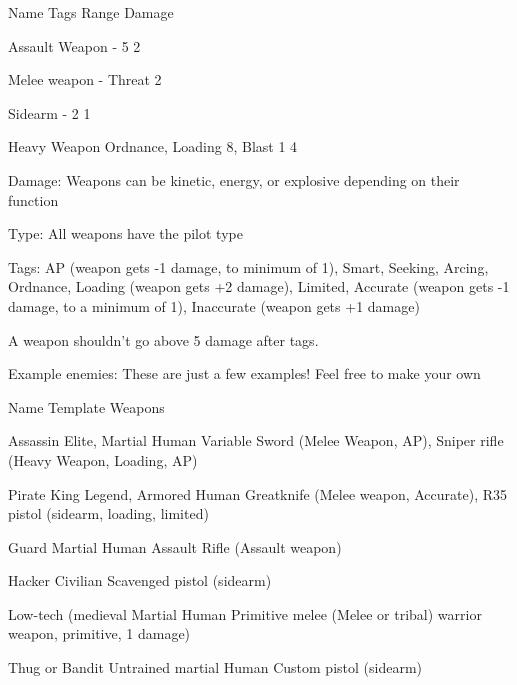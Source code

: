  Name                        Tags                          Range                    Damage 

 Assault Weapon               -                            5                        2 

 Melee weapon                 -                            Threat                   2 

                                                                                                         


 Sidearm                      -                             2                       1 

 Heavy Weapon                 Ordnance, Loading             8, Blast 1              4 

Damage: Weapons can be kinetic, energy, or explosive depending on their function
 
Type: All weapons have the pilot type
 
Tags: AP (weapon gets -1 damage, to minimum of 1), Smart, Seeking, Arcing, Ordnance,  
Loading (weapon gets +2 damage), Limited, Accurate (weapon gets -1 damage, to a minimum of  
1), Inaccurate (weapon gets +1 damage)
 

A weapon shouldn’t go above 5 damage after tags.
 

                                            Example enemies:  
These are just a few examples! Feel free to make your own
 

 Name                     Template                              Weapons 

 Assassin                  Elite, Martial Human                 Variable Sword (Melee  
                                                                Weapon, AP), Sniper rifle  
                                                                (Heavy Weapon, Loading,  
                                                                AP) 

 Pirate King               Legend, Armored Human                Greatknife (Melee weapon,  
                                                                Accurate), R35 pistol  
                                                                (sidearm, loading, limited) 

 Guard                     Martial Human                        Assault Rifle (Assault  
                                                                weapon) 

 Hacker                    Civilian                             Scavenged pistol (sidearm) 

 Low-tech (medieval        Martial Human                        Primitive melee (Melee  
 or tribal) warrior                                             weapon, primitive, 1  
                                                                damage) 

 Thug or Bandit            Untrained martial Human              Custom pistol (sidearm) 
